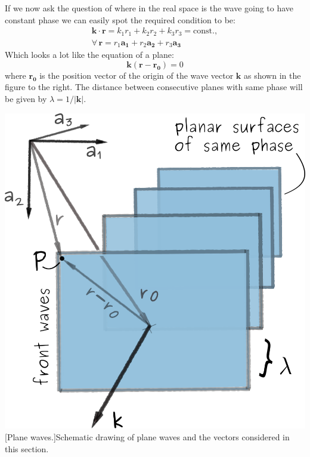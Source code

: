 \vspace{0.3cm}
\noindent \begin{minipage}{0.6\textwidth}
If we now ask the question of where in the real space is the wave going to have constant phase we can easily spot the required condition to be:
\begin{multline*}
\mathbf{k} \cdot \mathbf{r} = k_1 r_1 + k_2 r_2 + k_3 r_3 = \textrm{const.} , \\
\forall \, \mathbf{r} = r_1 \mathbf{a_1} + r_2 \mathbf{a_2} + r_3 \mathbf{a_3}
\end{multline*}
Which looks a lot like the equation of a plane:%
$$\mathbf{k}(\mathbf{r}-\mathbf{r_0}) = 0 $$
where $\mathbf{r_0}$ is the position vector of the origin of the wave vector $\mathbf{k}$  as shown in the figure to the right. The distance between consecutive planes with same phase will be given by $\lambda = 1/|\mathbf{k}|$.

\end{minipage}
\begin{minipage}{0.4\textwidth}
\centering
\captionsetup{width=.7\linewidth}
\includegraphics[width=1\linewidth]{Figures/planeWaves.png}
[Plane waves.]{Schematic drawing of plane waves and the vectors considered in this section.}
\label{Fig:planeWaves}

\end{minipage}


